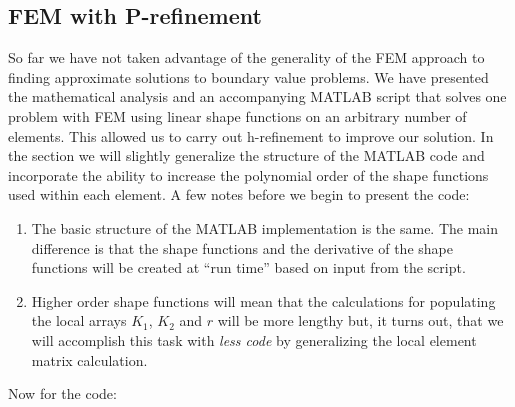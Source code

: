\subsection{FEM with P-refinement}
So far we have not taken advantage of the generality of the FEM approach to finding approximate solutions to boundary value problems.  We have presented the mathematical analysis and an accompanying MATLAB script that solves one problem with FEM using linear shape functions on an arbitrary number of elements.  This allowed us to carry out h-refinement to improve our solution.  In the section we will slightly generalize the structure of the MATLAB code and incorporate the ability to increase the polynomial order of the shape functions used within each element.  A few notes before we begin to present the code:
\begin{enumerate}
\item The basic structure of the MATLAB implementation is the same.  The main difference is that the shape functions and the derivative of the shape functions will be created at ``run time'' based on input from the script.  

\item Higher order shape functions will mean that the calculations for populating the local arrays $K_1$, $K_2$ and $r$ will be more lengthy but, it turns out, that we will accomplish this task with \emph{less code} by generalizing the local element matrix calculation.
\end{enumerate}
Now for the code:
\setcounter{lstannotation}{0}
